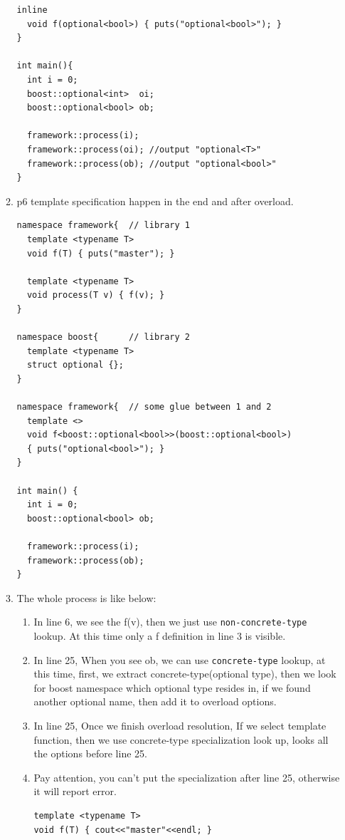 \documentclass[a4paper,11pt,twoside]{book}
\begin{document}
\begin{itemize}
\begin{enumerate}
\begin{lstlisting}[]
  inline
  void f(optional<bool>) { puts("optional<bool>"); }
}
 
int main(){
  int i = 0;
  boost::optional<int>  oi;
  boost::optional<bool> ob;
  
  framework::process(i);
  framework::process(oi); //output "optional<T>"
  framework::process(ob); //output "optional<bool>"
}
\end{lstlisting}

\item p6 template specification happen in the end and after overload. 
\begin{lstlisting}[]
namespace framework{  // library 1
  template <typename T>
  void f(T) { puts("master"); }
 
  template <typename T>
  void process(T v) { f(v); } 
}
 
namespace boost{      // library 2
  template <typename T>
  struct optional {};
}
 
namespace framework{  // some glue between 1 and 2
  template <>
  void f<boost::optional<bool>>(boost::optional<bool>)
  { puts("optional<bool>"); }
}
 
int main() {
  int i = 0;
  boost::optional<bool> ob;
  
  framework::process(i);
  framework::process(ob);
}
\end{lstlisting}

	\item The whole process is like below:
	\begin{enumerate}
		\item In line 6, we see the f(v), then we just use \texttt{non-concrete-type} lookup. At this time only a f definition in line 3 is visible.
		
		\item In line 25, When you see ob, we can use \texttt{concrete-type} lookup, at this time, first, we extract concrete-type(optional type), then we look for boost namespace which optional type resides in, if we found another optional name, then add it to overload options. 
		
		\item In line 25, Once we finish overload resolution, If we select template function, then we use concrete-type specialization look up, looks all the options before line 25.
		
		\item Pay attention, you can't put the specialization after line 25, otherwise it will report error.
\begin{lstlisting}
template <typename T>
void f(T) { cout<<"master"<<endl; }


\end{lstlisting}
\end{enumerate}
\end{enumerate}
\end{itemize}
\end{document}

